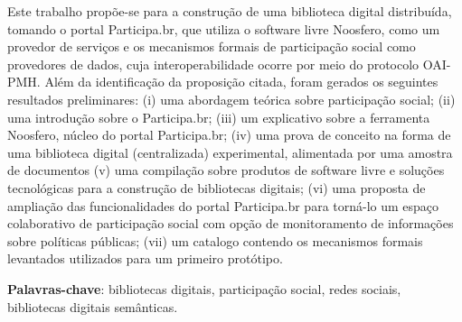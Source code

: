 \begin{resumo}

Este trabalho propõe-se para a construção de uma biblioteca digital distribuída, tomando o portal Participa.br, que utiliza o software livre Noosfero, como um provedor de serviços e os mecanismos formais de participação social como provedores de dados, cuja interoperabilidade ocorre por meio do protocolo OAI-PMH.
%
Além da identificação da proposição citada, foram gerados os seguintes resultados preliminares: (i) uma abordagem teórica sobre participação social; (ii) uma introdução sobre o Participa.br; (iii) um explicativo sobre a ferramenta Noosfero, núcleo do portal Participa.br; (iv) uma prova de conceito na forma de uma biblioteca digital (centralizada) experimental, alimentada por uma amostra de documentos (v) uma compilação sobre produtos de software livre e soluções tecnológicas para a construção de bibliotecas digitais; (vi) uma proposta de ampliação das funcionalidades do portal Participa.br para torná-lo um espaço colaborativo de participação social com opção de monitoramento de informações sobre políticas públicas; (vii) um catalogo contendo os mecanismos formais levantados utilizados para um primeiro protótipo.


\textbf{Palavras-chave}: bibliotecas digitais, participação social, redes sociais, bibliotecas digitais semânticas.

\end{resumo}
